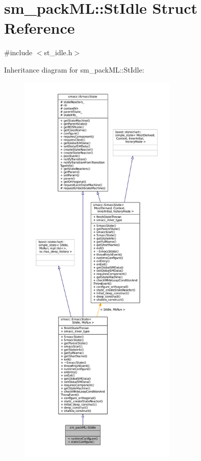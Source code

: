 \hypertarget{structsm__packML_1_1StIdle}{}\section{sm\+\_\+pack\+ML\+:\+:St\+Idle Struct Reference}
\label{structsm__packML_1_1StIdle}


{\ttfamily \#include $<$st\+\_\+idle.\+h$>$}



Inheritance diagram for sm\+\_\+pack\+ML\+:\+:St\+Idle\+:
\nopagebreak
\begin{figure}[H]
\begin{center}
\leavevmode
\includegraphics[height=550pt]{structsm__packML_1_1StIdle__inherit__graph}
\end{center}
\end{figure}



